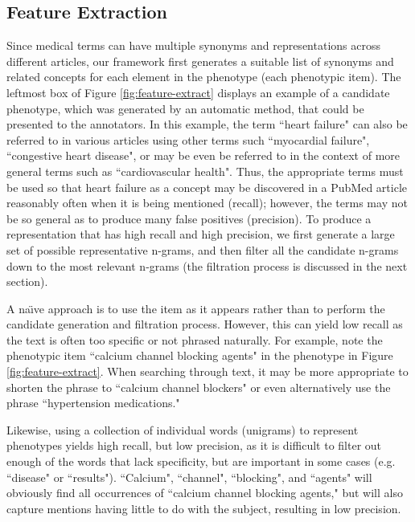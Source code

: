\documentclass{sig-alternate}
\begin{document}
\subsection{Feature Extraction}
Since medical terms can have multiple synonyms and representations across different articles, our framework first generates a suitable list of synonyms and related concepts for each element in the phenotype (each phenotypic item).
The leftmost box of Figure \ref{fig:feature-extract} displays an example of a candidate phenotype, which was generated by an automatic method, that could be presented to the annotators.
In this example, the term ``heart failure" can also be referred to in various articles using other terms such ``myocardial failure", ``congestive heart disease", or may be even be referred to in the context of more general terms such as ``cardiovascular health".
Thus, the appropriate terms must be used so that heart failure as a concept may be discovered in a PubMed article reasonably often when it is being mentioned (recall); however, the terms may not be so general as to produce many false positives (precision).
To produce a representation that has high recall and high precision, we first generate a large set of possible representative n-grams, and then filter all the candidate n-grams down to the most relevant n-grams (the filtration process is discussed in the next section).

A na\"{\i}ve approach is to use the item as it appears rather than to perform the candidate generation and filtration process.
However, this can yield low recall as the text is often too specific or not phrased naturally. 
For example, note the phenotypic item ``calcium channel blocking agents" in the phenotype in Figure \ref{fig:feature-extract}. 
When searching through text, it may be more appropriate to shorten the phrase to ``calcium channel blockers" or even alternatively use the phrase  ``hypertension medications." 

Likewise, using a collection of individual words (unigrams) to represent phenotypes yields high recall, but low precision, as it is difficult to filter out enough of the words that lack specificity, but are important in some cases (e.g. ``disease" or ``results").
``Calcium", ``channel", ``blocking", and ``agents" will obviously find all occurrences of ``calcium channel blocking agents," but will also capture mentions having little to do with the subject, resulting in low precision.
\end{document}

